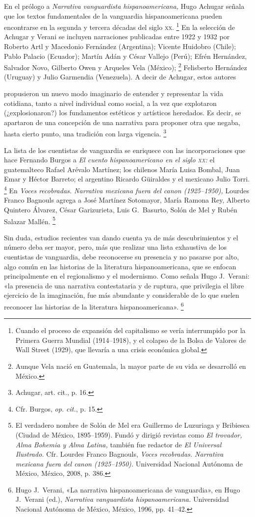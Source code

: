 \documentclass[14pt,twoside,final]{extbook} %
\let\oldfootnote\footnote
\renewcommand\footnote[1]{%
\oldfootnote{\hspace{1mm}#1}}
\begin{document}
En el prólogo a \emph{Narrativa vanguardista hispanoamericana,} Hugo Achugar señala que los textos fundamentales de la vanguardia hispanoamericana pueden encontrarse en la segunda y tercera décadas del siglo \textsc{xx}.\footnote{Cuando el proceso de expansión del capitalismo se vería interrumpido por la Primera Guerra Mundial (1914--1918), y el colapso de la Bolsa de Valores de Wall Street (1929), que llevaría a una crisis económica global.} En la selección de Achugar y Verani se incluyen narraciones publicadas entre 1922 y 1932 por Roberto Artl y Macedonio Fernández (Argentina); Vicente Huidobro (Chile); Pablo Palacio (Ecuador); Martín Adán y César Vallejo (Perú); Efrén Hernández, Salvador Novo, Gilberto Owen y Arqueles Vela (México);\footnote{Aunque Vela nació en Guatemala, la mayor parte de su vida se desarrolló en México.} Felisberto Hernández (Uruguay) y Julio Garmendia (Venezuela). A decir de Achugar, estos autores
\begin{quoting}
propusieron un nuevo modo imaginario de entender y representar la vida cotidiana, tanto a nivel individual como social, a la vez que explotaron (¿explosionaron?) los fundamentos estéticos y artísticos heredados. Es decir, se apartaron de una concepción de una narrativa para proponer otra que negaba, hasta cierto punto, una tradición con larga vigencia.\footnote{Achugar, art. cit., p. 16.}
\end{quoting}
La lista de los cuentistas de vanguardia se enriquece con las incorporaciones que hace Fernando Burgos a \emph{El cuento hispanoamericano en el siglo \textsc{xx}:} el guatemalteco Rafael Arévalo Martínez; los chilenos María Luisa Bombal, Juan Emar y Héctor Barreto; el argentino Ricardo Güiraldes y el mexicano Julio Torri.\footnote{Cfr. Burgos, \emph{op. cit.}, p. 15.} En \emph{Voces recobradas. Narrativa mexicana fuera del canon (\mbox{1925--1950}),} Lourdes Franco Bagnouls agrega a José Martínez Sotomayor, María Ramona Rey, Alberto Quintero Álvarez, César Garizurieta, Luis G.~Basurto, Solón de Mel y Rubén Salazar Mallén.\footnote{El verdadero nombre de Solón de Mel era Guillermo de Luzuriaga y Bribiesca (Ciudad de México, 1895--1959). Fundó y dirigió revistas como \textit{El trovador, Alma Bohemia \emph{y} Alma Latina,} también fue redactor de \emph{El Universal Ilustrado.} Cfr. Lourdes Franco Bagnouls, \emph{Voces recobradas. Narrativa mexicana fuera del canon (1925--1950).} Universidad Nacional Autónoma de México, México, 2008, p. 386.}

Sin duda, estudios recientes van dando cuenta ya de más descubrimientos y el número deba ser mayor, pero, más que realizar una lista exhaustiva de los cuentistas de vanguardia, debe reconocerse su presencia y no pasarse por alto, algo común en las historias de la literatura hispanoamericana, que se enfocan principalmente en el regionalismo y el modernismo. Como señala Hugo J.~Verani: «la presencia de una narrativa contestataria y de ruptura, que privilegia el libre ejercicio de la imaginación, fue más abundante y considerable de lo que suelen reconocer las historias de la literatura hispanoamericana».\footnote{Hugo J.~Verani, «La narrativa hispanoamericana de vanguardia», en Hugo J.~Verani (ed.), \emph{Narrativa vanguardista hispanoamericana.} Universidad Nacional Autónoma de México, México, 1996, pp. 41--42.}
\end{document}
